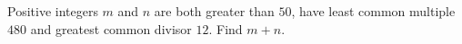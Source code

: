 Positive integers $m$ and $n$ are both greater than $50$, have least common multiple $480$ and greatest common divisor $12$. Find $m+n$.
